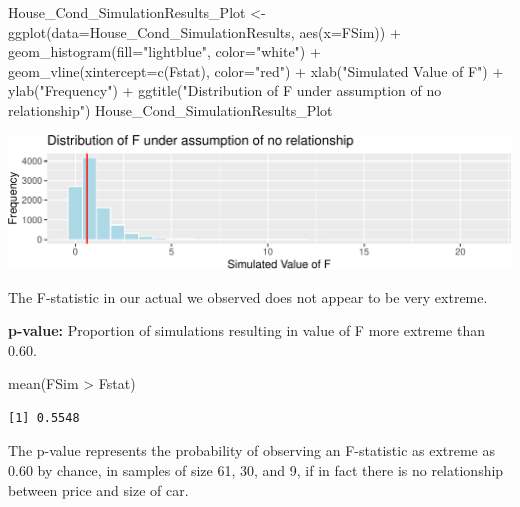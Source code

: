 \documentclass[
  letterpaper,
  DIV=11,
  numbers=noendperiod]{scrreprt}
\newenvironment{Shaded}{\begin{snugshade}}{\end{snugshade}}
\newcommand{\AttributeTok}[1]{\textcolor[rgb]{0.40,0.45,0.13}{#1}}
\newcommand{\FunctionTok}[1]{\textcolor[rgb]{0.28,0.35,0.67}{#1}}
\newcommand{\NormalTok}[1]{\textcolor[rgb]{0.00,0.23,0.31}{#1}}
\newcommand{\OtherTok}[1]{\textcolor[rgb]{0.00,0.23,0.31}{#1}}
\newcommand{\SpecialCharTok}[1]{\textcolor[rgb]{0.37,0.37,0.37}{#1}}
\newcommand{\StringTok}[1]{\textcolor[rgb]{0.13,0.47,0.30}{#1}}
\begin{document}
\begin{Shaded}
\begin{Highlighting}[]
\NormalTok{House\_Cond\_SimulationResults\_Plot }\OtherTok{\textless{}{-}} \FunctionTok{ggplot}\NormalTok{(}\AttributeTok{data=}\NormalTok{House\_Cond\_SimulationResults, }
                                            \FunctionTok{aes}\NormalTok{(}\AttributeTok{x=}\NormalTok{FSim)) }\SpecialCharTok{+} 
  \FunctionTok{geom\_histogram}\NormalTok{(}\AttributeTok{fill=}\StringTok{"lightblue"}\NormalTok{, }\AttributeTok{color=}\StringTok{"white"}\NormalTok{) }\SpecialCharTok{+}  \FunctionTok{geom\_vline}\NormalTok{(}\AttributeTok{xintercept=}\FunctionTok{c}\NormalTok{(Fstat), }\AttributeTok{color=}\StringTok{"red"}\NormalTok{) }\SpecialCharTok{+} 
  \FunctionTok{xlab}\NormalTok{(}\StringTok{"Simulated Value of F"}\NormalTok{) }\SpecialCharTok{+} \FunctionTok{ylab}\NormalTok{(}\StringTok{"Frequency"}\NormalTok{) }\SpecialCharTok{+}  \FunctionTok{ggtitle}\NormalTok{(}\StringTok{"Distribution of F under assumption of no relationship"}\NormalTok{)}
\NormalTok{House\_Cond\_SimulationResults\_Plot}
\end{Highlighting}
\end{Shaded}

\includegraphics{Ch3_files/figure-pdf/unnamed-chunk-245-1.pdf}

The F-statistic in our actual we observed does not appear to be very
extreme.

\textbf{p-value:} Proportion of simulations resulting in value of F more
extreme than 0.60.

\begin{Shaded}
\begin{Highlighting}[]
\FunctionTok{mean}\NormalTok{(FSim }\SpecialCharTok{\textgreater{}}\NormalTok{ Fstat)}
\end{Highlighting}
\end{Shaded}

\begin{verbatim}
[1] 0.5548
\end{verbatim}

The p-value represents the probability of observing an F-statistic as
extreme as 0.60 by chance, in samples of size 61, 30, and 9, if in fact
there is no relationship between price and size of car.
\end{document}
